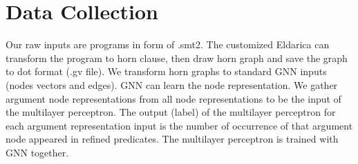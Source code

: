 \documentclass{article}
\begin{document}
%
%
%


\section{Data Collection}
Our raw inputs are programs in form of .smt2. The customized Eldarica can transform the program to horn clause, then draw horn graph and save the graph to dot format (.gv file). We transform horn graphs to standard GNN inputs (nodes vectors and edges). GNN can learn the node representation. We gather argument node representations from all node representations to be the input of the multilayer perceptron. The output (label) of the multilayer perceptron for each argument representation input is the number of occurrence of that argument node appeared in refined predicates. The multilayer perceptron is trained with GNN together.
\end{document}
